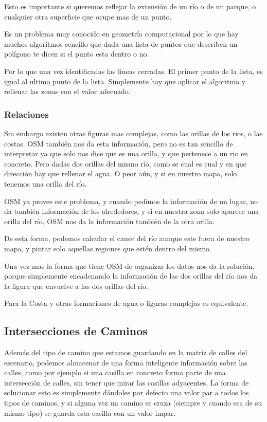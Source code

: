 Esto es importante si queremos reflejar la extensión de un río o de un parque,
o cualquier otra superficie que ocupe mas de un punto.

Es un problema muy conocido en geometría computacional por lo que hay muchos
algoritmos sencillo que dada una lista de
puntos que describen un polígono te dicen si el punto esta dentro o no.

Por lo que una vez identificadas las lineas cerradas. El primer punto de la
lista, es igual al ultimo punto de la lista. Simplemente hay que aplicar el
algoritmo y rellenar las zonas con el valor adecuado.
\subsubsection*{Relaciones}
Sin embargo existen otras figuras mas complejas, como las orillas de los rios,
o las costas. OSM también nos da esta información, pero no es tan sencillo de
interpretar ya que solo nos dice que es una orilla, y que pertenece a un rio en
concreto.
Pero dadas dos orillas del mismo río, como se cual es cual y en que dirección
hay que rellenar el agua. O peor aún, y si en nuestro mapa, solo tenemos una
orilla del río.

OSM ya provee este problema, y cuando pedimos la información de un lugar, no da
también información de los alrededores, y si en nuestra zona solo aparece una
orilla del río, OSM nos da la información también de la otra orilla.

De esta forma, podemos calcular el cauce del río aunque este fuera de nuestro
mapa, y pintar solo aquellas regiones que estén dentro del mismo.

Una vez mas la forma que tiene OSM de organizar los datos nos da la solución,
porque simplemente encadenando la información de las dos orillas del río nos da
la figura que envuelve a las dos orillas del río.

Para la Costa y otras formaciones de agua o figuras complejas es equivalente.
\subsection*{Intersecciones de Caminos} \label{Intersecciones}
Además del tipo de camino que estamos guardando en la matriz de calles del
escenario, podemos almacenar de una forma inteligente información sobre las
calles, como por ejemplo si una casilla en concreto forma parte de una
intersección de calles, sin tener que mirar las casillas adyacentes. La forma
de solucionar esto es simplemente dándoles por defecto una valor par a todos
los tipos de caminos, y si alguna vez un camino se cruza (siempre y cuando sea
de su mismo tipo) se guarda esta casilla con un valor impar.

